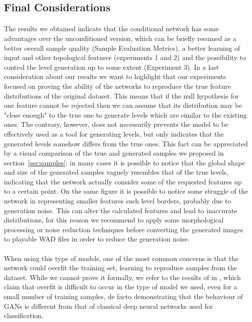  
\subsection{Final Considerations}
\paragraph{} The results we obtained indicate that the conditional network has some advantages over the unconditioned version, which can be briefly resumed as a better overall sample quality (Sample Evaluation Metrics), a better learning of input and other topological features (experiments 1 and 2) and the possibility to control the level generation up to some extent (Experiment 3). In a last consideration about our results we want to highlight that our experiments focused on proving the ability of the networks to reproduce the true feature distributions of the original dataset. This means that if the null hypothesis for one feature cannot be rejected then we can assume that its distribution may be "close enough" to the true one to generate levels which are similar to the existing ones. The contrary, however, does not necessarily prevents the model to be effectively used as a tool for generating levels, but only indicates that the generated levels somehow differs from the true ones. This fact can be appreciated by a visual comparison of the true and generated samples we proposed in section~\ref{sec:samples}: in many cases it is possible to notice that the global shape and size of the generated samples vaguely resembles that of the true levels, indicating that the network actually consider some of the requested features up to a certain point. On the same figure it is possible to notice some struggle of the network in representing smaller features such level borders, probably due to generation noise. This can alter the calculated features and lead to inaccurate distributions, for this reason we recommend to apply some morphological processing or noise reduction techniques before converting the generated images to playable WAD files in order to reduce the generation noise.

\paragraph{} When using this type of models, one of the most common concerns is that the network could overfit the training set, learning to reproduce samples from the dataset. While we cannot prove it formally, we refer to the results of \citeauthor{empiricalevaluation} in \cite[Appendix~C]{empiricalevaluation}, which claim that overfit is difficult to occur in the type of model we used, even for a small number of training samples, de facto demonstrating that the behaviour of GANs is different from that of classical deep neural networks used for classification.

